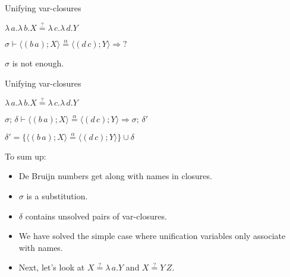 \documentclass[pdf]{beamer}
\newcommand{\clos}[2] {
\langle #2; #1 \rangle
}
\newcommand{\app}[2] {
#1\, #2
}
\newcommand{\transition}[4] {
  $#1 \vdash #2 \stackrel{\alpha}{=} #3 \Rightarrow #4$
}
\newcommand{\eqha}[2] {
  #1\stackrel{?}{=}#2
}
\begin{document}
\begin{frame}{Unifying var-closures}

 {\centering
     $\eqha{\lambda\,a.\lambda\,b.X}{\lambda\,c.\lambda\,d.Y}$

    \vspace{1cm}
   \transition
    {\sigma}
    {\clos{X}{(b\,a)}}
    {\clos{Y}{(d\,c)}}
    {?}
    \par}
   
  \vspace{1cm}
  {\centering
   $\sigma$ is not enough.
 \par}
\end{frame}

\begin{frame}{Unifying var-closures}

 {\centering
    $\eqha{\lambda\,a.\lambda\,b.X}{\lambda\,c.\lambda\,d.Y}$

    \vspace{1cm}
   \transition
    {\sigma;\,\delta}
    {\clos{X}{(b\,a)}}
    {\clos{Y}{(d\,c)}}
    {\sigma;\,\delta'}

    \vspace{1cm}
    $\delta' = \{\clos{X}{(b\,a)} \stackrel{\alpha}{=} \clos{Y}{(d\,c)}\}\cup\delta$
    \par}
\end{frame}

\begin{frame}{To sum up:}
  
  \begin{itemize}
  \item De Bruijn numbers get along with names in closures.
    
  \item $\sigma$ is a substitution.
    
  \item $\delta$ contains unsolved pairs of var-closures.
    
  \item We have solved the simple case where unification variables only associate
    with names.

  \item Next, let's look at $\eqha{X}{\lambda\,a.Y}$ and $\eqha{X}{\app{Y}{Z}}$.
  \end{itemize}
\end{frame}
\end{document}
